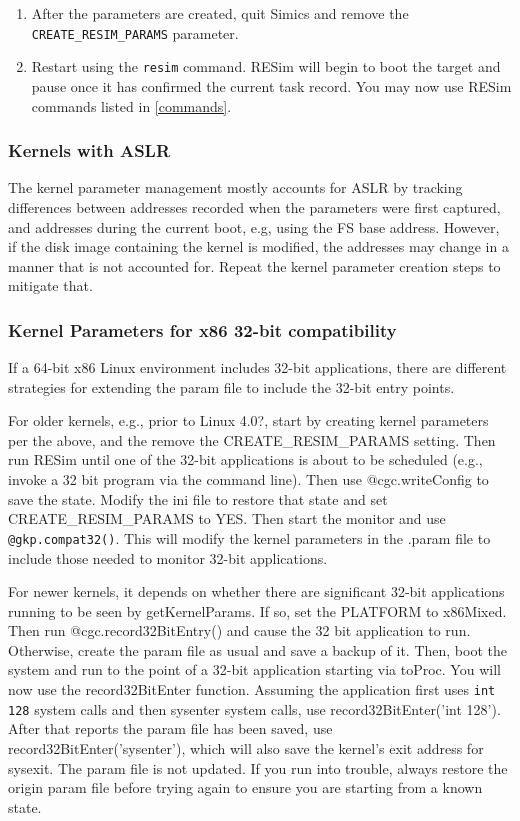\documentclass[titlepage]{article}
\begin{document}
\begin{enumerate}
with the target system via its console, e.g., to schedule a new process.  If it displays a message saying it is not in the kernel,
try running ahead a bit, e.g., {\tt r 10000} and try the gkp.go command again.  For ARM platforms set the PLATFORM env value. 
\item After the parameters are created, quit Simics and remove the {\tt CREATE\_RESIM\_PARAMS} parameter.
\item Restart using the {\tt resim} command.  RESim will begin to boot the target and pause once it has confirmed the current task record.  You
may now use RESim commands listed in \ref{commands}.
\end{enumerate}

\subsubsection{Kernels with ASLR}
The kernel parameter management mostly accounts for ASLR by tracking differences between addresses recorded when the parameters were first
captured, and addresses during the current boot, e.g, using the FS base address.  However, if the disk image containing the kernel is modified,
the addresses may change in a manner that is not accounted for.  Repeat the kernel parameter creation steps to mitigate that.

\subsubsection{Kernel Parameters for x86 32-bit compatibility}
If a 64-bit x86 Linux environment includes 32-bit applications, there are different strategies for extending the param file to include the 32-bit entry points.

For older kernels, e.g., prior to Linux 4.0?,  start by creating kernel parameters per the above, and the remove the CREATE\_RESIM\_PARAMS setting.
Then run RESim until one of the 32-bit applications is about to be 
scheduled (e.g., invoke a 32 bit program via the command line).  Then use @cgc.writeConfig to save the state.  
Modify the ini file to restore that state and set CREATE\_RESIM\_PARAMS to YES.  Then start the monitor and use
{\tt @gkp.compat32()}.  This will modify the kernel parameters in the .param file to include those needed to monitor 32-bit applications.

For newer kernels, it depends on whether there are significant 32-bit applications running to be seen by getKernelParams.  If so, set the
PLATFORM to x86Mixed. Then run @cgc.record32BitEntry() and cause the 32 bit application to run.
Otherwise, create the param file as usual and save a backup of it.  Then, boot the system and run to the point of a 32-bit application starting via
toProc.  You will now use the record32BitEnter function.  Assuming the application first uses {\tt int 128} system calls and then sysenter system calls,
use record32BitEnter('int 128').  After that reports the param file has been saved, use record32BitEnter('sysenter'), which will also save the kernel's
exit address for sysexit.  The param file is not updated.  If you run into trouble, always restore the origin param file before trying again to ensure
you are starting from a known state.
\end{document}
